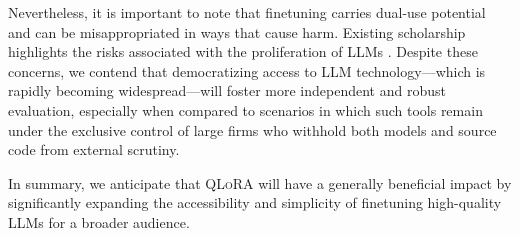 Nevertheless, it is important to note that finetuning carries dual-use potential and can be misappropriated in ways that cause harm. Existing scholarship highlights the risks associated with the proliferation of LLMs \citep{bommasani2021opportunities,bender2021dangers}. Despite these concerns, we contend that democratizing access to LLM technology—which is rapidly becoming widespread—will foster more independent and robust evaluation, especially when compared to scenarios in which such tools remain under the exclusive control of large firms who withhold both models and source code from external scrutiny.

In summary, we anticipate that \textsc{QLoRA} will have a generally beneficial impact by significantly expanding the accessibility and simplicity of finetuning high-quality LLMs for a broader audience.